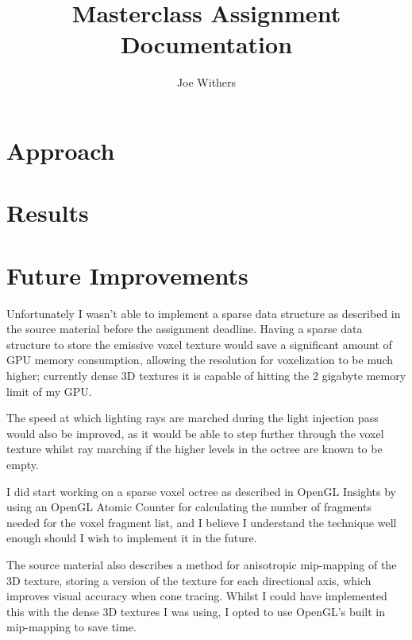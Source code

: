 \documentclass[11pt]{article}
\title{\textbf{Masterclass Assignment Documentation}}
\author{Joe Withers}
\date{}
\begin{document}
\maketitle

\section{Approach}

\section{Results}

\section{Future Improvements}

Unfortunately I wasn't able to implement a sparse data structure as described in the source material\cite{crassin_neyret_sainz_green_eisemann_2011} before the assignment deadline. Having a sparse data structure to store the emissive voxel texture would save a significant amount of GPU memory consumption, allowing the resolution for voxelization to be much higher; currently dense 3D textures it is capable of hitting the 2 gigabyte memory limit of my GPU.

The speed at which lighting rays are marched during the light injection pass would also be improved, as it would be able to step further through the voxel texture whilst ray marching if the higher levels in the octree are known to be empty.

I did start working on a sparse voxel octree as described in OpenGL Insights\cite{crassin_green_2012} by using an OpenGL Atomic Counter for calculating the number of fragments needed for the voxel fragment list, and I believe I understand the technique well enough should I wish to implement it in the future.

The source material\cite{crassin_neyret_sainz_green_eisemann_2011} also describes a method for anisotropic mip-mapping of the 3D texture, storing a version of the texture for each directional axis, which improves visual accuracy when cone tracing. Whilst I could have implemented this with the dense 3D textures I was using, I opted to use OpenGL's built in mip-mapping to save time.



\end{document}
